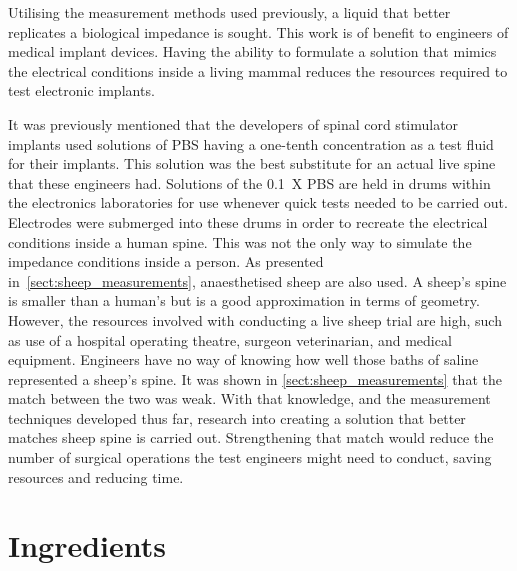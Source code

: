 
Utilising the measurement methods used previously, a liquid that better replicates a biological impedance is sought.
This work is of benefit to engineers of medical implant devices.
Having the ability to formulate a solution that mimics the electrical conditions inside a living mammal reduces the resources required to test electronic implants.

It was previously mentioned that the developers of spinal cord stimulator implants used solutions of PBS having a one-tenth concentration as a test fluid for their implants.
This solution was the best substitute for an actual live spine that these engineers had.
Solutions of the \SI{0.1}{X} PBS are held in drums within the electronics laboratories for use whenever quick tests needed to be carried out.
Electrodes were submerged into these drums in order to recreate the electrical conditions inside a human spine.
This was not the only way to simulate the impedance conditions inside a person.
As presented in~\cref{sect:sheep_measurements}, anaesthetised sheep are also used.
A sheep's spine is smaller than a human's but is a good approximation in terms of geometry.
However, the resources involved with conducting a live sheep trial are high, such as use of a hospital operating theatre, surgeon veterinarian, and medical equipment.
Engineers have no way of knowing how well those baths of saline represented a sheep's spine.
It was shown in \cref{sect:sheep_measurements} that the match between the two was weak.
With that knowledge, and the measurement techniques developed thus far, research into creating a solution that better matches sheep spine is carried out.
Strengthening that match would reduce the number of surgical operations the test engineers might need to conduct, saving resources and reducing time.

\section{Ingredients}

